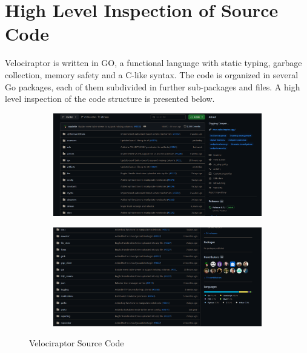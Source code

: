 \documentclass[a4paper, 11pt, oneside]{article} %
\begin{document}
\section{High Level Inspection of Source Code}
Velociraptor is written in GO, a functional language with static typing, garbage collection, memory safety and a C-like syntax. The code is organized in several Go packages, each of them subdivided in further sub-packages and files. A high level inspection of the code structure is presented below.
\begin{figure}[ht]
\centering
\begin{subfigure}{0.48\textwidth}
    \includegraphics[width=\linewidth, center]{img/src/1.png}
    \label{fig:src1}
\end{subfigure}
\begin{subfigure}{0.48\textwidth}
    \includegraphics[width=\linewidth, center]{img/src/2.png}
    \label{fig:src2}
\end{subfigure}
\caption{Velociraptor Source Code}
\label{fig:src_code}
\end{figure}
\end{document}
